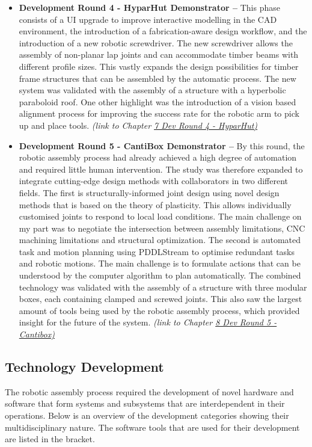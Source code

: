 \begin{itemize}
    \item \textbf{Development Round 4 - HyparHut Demonstrator --} This phase consists of a UI upgrade to improve interactive modelling in the CAD environment, the introduction of a fabrication-aware design workflow, and the introduction of a new robotic screwdriver. The new screwdriver allows the assembly of non-planar lap joints and can accommodate timber beams with different profile sizes. This vastly expands the design possibilities for timber frame structures that can be assembled by the automatic process. The new system was validated with the assembly of a structure with a hyperbolic paraboloid roof. One other highlight was the introduction of a vision based alignment process for improving the success rate for the robotic arm to pick up and place tools. \textit{(link to Chapter \ul{7 Dev Round 4 - HyparHut) }}
    \item \textbf{Development Round 5 - CantiBox Demonstrator --} By this round, the robotic assembly process had already achieved a high degree of automation and required little human intervention. The study was therefore expanded to integrate cutting-edge design methods with collaborators in two different fields. The first is structurally-informed joint design using novel design methods that is based on the theory of plasticity. This allows individually customised joints to respond to local load conditions. The main challenge on my part was to negotiate the intersection between assembly limitations, CNC machining limitations and structural optimization. The second is automated task and motion planning using PDDLStream to optimise redundant tasks and robotic motions. The main challenge is to formulate actions that can be understood by the computer algorithm to plan automatically. The combined technology was validated with the assembly of a structure with three modular boxes, each containing clamped and screwed joints. This also saw the largest amount of tools being used by the robotic assembly process, which provided insight for the future of the system. \textit{(link to Chapter \ul{8 Dev Round 5 - Cantibox)}}
 
\end{itemize}
\subsection{Technology Development}

The robotic assembly process required the development of novel hardware and software that form systems and subsystems that are interdependent in their operations. Below is an overview of the development categories showing their multidisciplinary nature. The software tools that are used for their development are listed in the bracket. 

